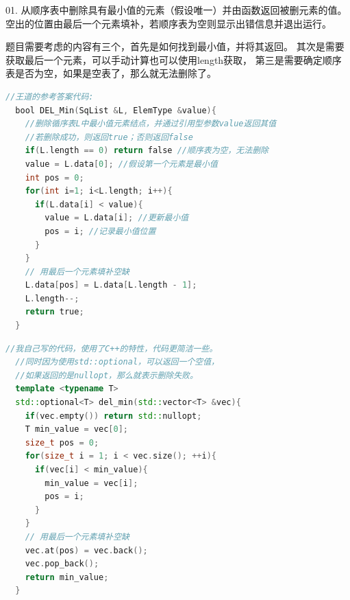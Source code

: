 \documentclass[b5paper,11pt]{article}
\begin{document}
\begin{question}
01. 从顺序表中删除具有最小值的元素（假设唯一）并由函数返回被删元素的值。
空出的位置由最后一个元素填补，若顺序表为空则显示出错信息并退出运行。

\end{question}
\begin{solution}
题目需要考虑的内容有三个，首先是如何找到最小值，并将其返回。
其次是需要获取最后一个元素，可以手动计算也可以使用length获取，
第三是需要确定顺序表是否为空，如果是空表了，那么就无法删除了。

\begin{lstlisting}[language=C]
  //王道的参考答案代码:
  bool DEL_Min(SqList &L, ElemType &value){
    //删除循序表L中最小值元素结点，并通过引用型参数value返回其值
    //若删除成功，则返回true；否则返回false
    if(L.length == 0) return false //顺序表为空，无法删除
    value = L.data[0]; //假设第一个元素是最小值
    int pos = 0;
    for(int i=1; i<L.length; i++){
      if(L.data[i] < value){
        value = L.data[i]; //更新最小值
        pos = i; //记录最小值位置
      }
    }
    // 用最后一个元素填补空缺
    L.data[pos] = L.data[L.length - 1];
    L.length--;
    return true;
  }
\end{lstlisting}

\begin{lstlisting}[language=C++]
  //我自己写的代码，使用了C++的特性，代码更简洁一些。
  //同时因为使用std::optional，可以返回一个空值，
  //如果返回的是nullopt，那么就表示删除失败。
  template <typename T>
  std::optional<T> del_min(std::vector<T> &vec){
    if(vec.empty()) return std::nullopt;
    T min_value = vec[0];
    size_t pos = 0;
    for(size_t i = 1; i < vec.size(); ++i){
      if(vec[i] < min_value){
        min_value = vec[i];
        pos = i;
      }
    }
    // 用最后一个元素填补空缺
    vec.at(pos) = vec.back();
    vec.pop_back();
    return min_value;
  }
\end{lstlisting}
\end{solution}
\psplit
\end{document}
